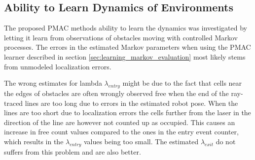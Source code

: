 \subsection{Ability to Learn Dynamics of Environments}
The proposed PMAC methods ability to learn the dynamics was investigated by letting it learn from observations of obstacles moving with controlled Markov processes.
The errors in the estimated Markov parameters when using the PMAC learner described in section \ref{sec:learning_markov_evaluation} most likely stems from unmodeled localization errors. 

The wrong estimates for lambda $\lambda_{entry}$ might be due to the fact that cells near the edges of obstacles are often wrongly observed free when the end of the ray-traced lines are too long due to errors in the estimated robot pose.
When the lines are too short due to localization errors the cells further from the laser in the direction of the line are however not counted up as occupied.
This causes an increase in free count values compared to the ones in the entry event counter, which results in the $\lambda_{entry}$ values being too small.
The estimated $\lambda_{exit}$ do not suffers from this problem and are also better.